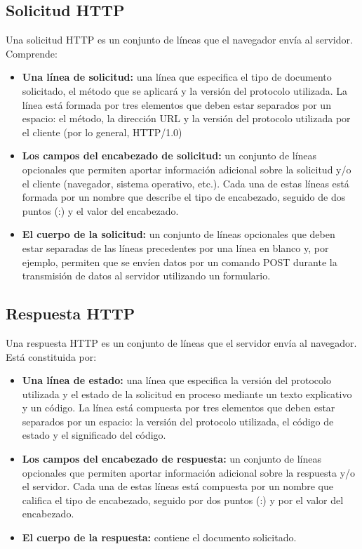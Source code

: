 \documentclass[12pt, a4paper, titlepage]{report}
\begin{document}
        	\subsection{Solicitud HTTP}
        	    Una solicitud HTTP es un conjunto de líneas que el navegador envía al servidor. Comprende:
        	    \begin{itemize}
        	        \item \textbf{Una línea de solicitud: } una línea que especifica el tipo de documento solicitado, el método que se aplicará y la versión del protocolo utilizada. La línea está formada por tres elementos que deben estar separados por un espacio: el método, la dirección URL y la versión del protocolo utilizada por el cliente (por lo general, HTTP/1.0)
        	        \item \textbf{Los campos del encabezado de solicitud: } un conjunto de líneas opcionales que permiten aportar información adicional sobre la solicitud y/o el cliente (navegador, sistema operativo, etc.). Cada una de estas líneas está formada por un nombre que describe el tipo de encabezado, seguido de dos puntos (:) y el valor del encabezado.
        	        \item \textbf{ El cuerpo de la solicitud: }un conjunto de líneas opcionales que deben estar separadas de las líneas precedentes por una línea en blanco y, por ejemplo, permiten que se envíen datos por un comando POST durante la transmisión de datos al servidor utilizando un formulario. 
        	    \end{itemize}
            \subsection{Respuesta HTTP}
                Una respuesta HTTP es un conjunto de líneas que el servidor envía al navegador. Está constituida por:
                \begin{itemize}
                    \item \textbf{Una línea de estado: } una línea que especifica la versión del protocolo utilizada y el estado de la solicitud en proceso mediante un texto explicativo y un código. La línea está compuesta por tres elementos que deben estar separados por un espacio: la versión del protocolo utilizada, el código de estado y el significado del código.
                    \item \textbf{Los campos del encabezado de respuesta: } un conjunto de líneas opcionales que permiten aportar información adicional sobre la respuesta y/o el servidor. Cada una de estas líneas está compuesta por un nombre que califica el tipo de encabezado, seguido por dos puntos (:) y por el valor del encabezado.
                    \item \textbf{El cuerpo de la respuesta: } contiene el documento solicitado. 
                \end{itemize}
                
\end{document}
